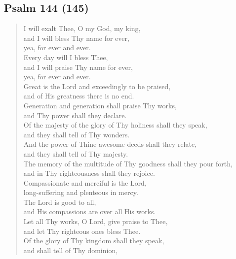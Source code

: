 {		\subsection*{Psalm 144 (145)}
			\begin{verse}
				I will exalt Thee, O my God, my king,\nolinebreak\\
				and I will bless Thy name for ever,\nolinebreak\\
				yea, for ever and ever.\nolinebreak\\
				Every day will I bless Thee,\nolinebreak\\
				and I will praise Thy name for ever,\nolinebreak\\
				yea, for ever and ever.\nolinebreak\\
				Great is the Lord and exceedingly to be praised,\nolinebreak\\
				and of His greatness there is no end.\nolinebreak\\
				Generation and generation shall praise Thy works,\nolinebreak\\
				and Thy power shall they declare.\nolinebreak\\
				Of the majesty of the glory of Thy holiness shall they speak,\nolinebreak\\
				and they shall tell of Thy wonders.\nolinebreak\\
				And the power of Thine awesome deeds shall they relate,\nolinebreak\\
				and they shall tell of Thy majesty.\nolinebreak\\
				The memory of the multitude of Thy goodness shall they pour forth,\nolinebreak\\
				and in Thy righteousness shall they rejoice.\nolinebreak\\
				Compassionate and merciful is the Lord,\nolinebreak\\
				long-suffering and plenteous in mercy.\nolinebreak\\
				The Lord is good to all,\nolinebreak\\
				and His compassions are over all His works.\nolinebreak\\
				Let all Thy works, O Lord, give praise to Thee,\nolinebreak\\
				and let Thy righteous ones bless Thee.\nolinebreak\\
				Of the glory of Thy kingdom shall they speak,\nolinebreak\\
				and shall tell of Thy dominion,\nolinebreak\\

\end{verse}}
